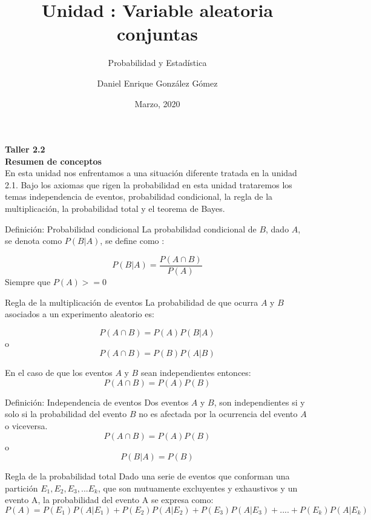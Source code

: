 \documentclass[base=hide,12pt]{elegantbook}
\title{Unidad : Variable aleatoria conjuntas}
\subtitle{Probabilidad y Estadística}
\author{Daniel Enrique González Gómez}
\institute{Pontificia Universidad Javeriana Cali}
\date{Marzo, 2020}
\begin{document}
\textcolor{col4}{\LARGE \bf Taller 2.2}   \\


\textcolor{col4}{\Large \bf Resumen de conceptos}   \\

En esta unidad nos enfrentamos a una  situación  diferente tratada en  la unidad 2.1. Bajo los axiomas que rigen la  probabilidad en esta unidad trataremos  los temas  independencia de eventos, probabilidad condicional, la regla de la multiplicación,  la probabilidad total y el teorema de Bayes.\\

\begin{Box2}{Definición: Probabilidad condicional}
La probabilidad condicional de $B$, dado $A$, se denota  como  $P(B|A)$, se define como :

$$P(B|A) = \dfrac{P(A \cap B)}{P(A)}$$
Siempre que $P(A)> =0$	
\end{Box2}


\begin{Box2}{Regla de  la multiplicación  de eventos}
La probabilidad de que ocurra $A$ y $B$  asociados a un experimento aleatorio es:

$$P(A \cap B) = P(A) P(B | A) $$
o
$$P(A \cap B) = P(B) P(A | B) $$

En el caso de que los eventos $A$  y $B$ sean independientes entonces:
$$P(A \cap B) = P(A) P(B) $$	
\end{Box2}


\begin{Box2}{Definición: Independencia de eventos}
	Dos eventos $A$ y $B$, son independientes si y  solo si la probabilidad del evento $B$ no es afectada por la ocurrencia del evento  $A$ o viceversa.	
	$$P(A \cap B) = P(A) P(B) $$
	o
	$$P(B |A )  = P(B) $$
	
\end{Box2}

\begin{Box2}{Regla de  la probabilidad total}
Dado una serie de eventos que conforman una partición $E_1, E_2, E_3,...E_k$, que son mutuamente excluyentes y exhaustivos y un evento A, la probabilidad del evento A se expresa como:
$$P(A) = P(E_1) P(A|E_1) + P(E_2) P(A|E_2) + P(E_3) P(A|E_3) + .... + P(E_k) P(A|E_k) $$
\end{Box2}
\end{document}
